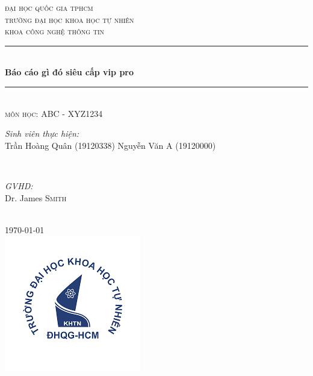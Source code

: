 \documentclass[12pt]{article}
\begin{document}
\begin{titlepage}
\newcommand{\HRule}{\rule{\linewidth}{0.5mm}} %

\centering %


\textsc{\LARGE đại học quốc gia tphcm}\\[1.5cm] %
\textsc{\Large trường đại học khoa học tự nhiên}\\[0.5cm] %
\textsc{\large khoa công nghệ thông tin}\\[0.5cm] %


\HRule \\[0.4cm]
{ \huge \bfseries Báo cáo gì đó siêu cấp vip pro}\\[0.4cm]
\HRule \\[1.5cm]

\textsc{môn học: ABC - XYZ1234}\\[0.5cm]

\begin{minipage}{0.4\textwidth}
\begin{flushleft} \large
\emph{Sinh viên thực hiện:}\\
Trần Hoàng Quân \textsc{(19120338)} %
Nguyễn Văn A \textsc{(19120000)}
\end{flushleft}
\end{minipage}
~
\begin{minipage}{0.4\textwidth}
\begin{flushright} \large
\emph{GVHD:} \\
Dr. James \textsc{Smith} %
\end{flushright}
\end{minipage}\\[2cm]

{\large \today}\\[2cm]

\includegraphics{hcmus-logo.png}\\[1cm] 

\vfill %
\end{titlepage}
	
\end{document}
